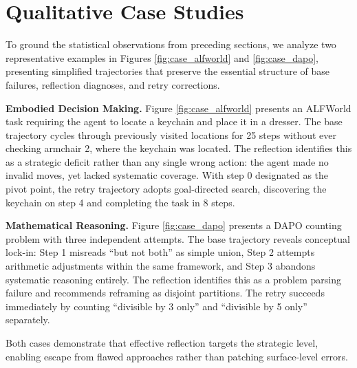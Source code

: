 \documentclass[11pt]{article}
\theoremstyle{definition}
\theoremstyle{remark}
\begin{document}
\section{Qualitative Case Studies}
\label{sec:case_studies}

To ground the statistical observations from preceding sections, we analyze two representative examples in Figures \ref{fig:case_alfworld} and \ref{fig:case_dapo}, presenting simplified trajectories that preserve the essential structure of base failures, reflection diagnoses, and retry corrections.

\textbf{Embodied Decision Making.} Figure \ref{fig:case_alfworld} presents an ALFWorld task requiring the agent to locate a keychain and place it in a dresser. The base trajectory cycles through previously visited locations for 25 steps without ever checking armchair 2, where the keychain was located. The reflection identifies this as a strategic deficit rather than any single wrong action: the agent made no invalid moves, yet lacked systematic coverage. With step 0 designated as the pivot point, the retry trajectory adopts goal-directed search, discovering the keychain on step 4 and completing the task in 8 steps.

\textbf{Mathematical Reasoning.} Figure \ref{fig:case_dapo} presents a DAPO counting problem with three independent attempts. The base trajectory reveals conceptual lock-in: Step 1 misreads ``but not both'' as simple union, Step 2 attempts arithmetic adjustments within the same framework, and Step 3 abandons systematic reasoning entirely. The reflection identifies this as a problem parsing failure and recommends reframing as disjoint partitions. The retry succeeds immediately by counting ``divisible by 3 only'' and ``divisible by 5 only'' separately.

Both cases demonstrate that effective reflection targets the strategic level, enabling escape from flawed approaches rather than patching surface-level errors.




\end{document}
